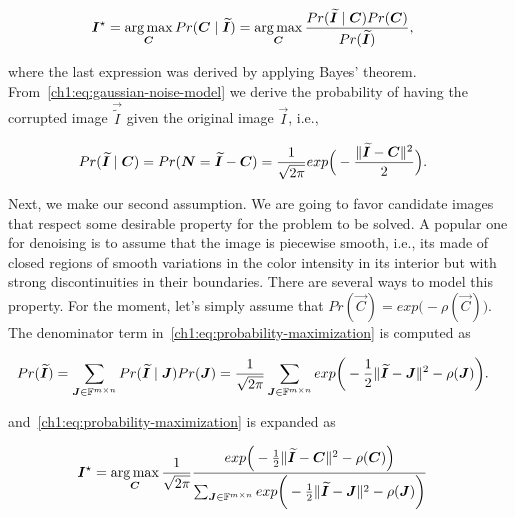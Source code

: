 \begin{align}
	\bm{I}^{\star} & = \operatorname*{arg\,max} _{\bm{C}}{Pr(\bm{C} \; | \;\bm{\widetilde{I}})} = \operatorname*{arg\,max} _{\bm{C}} \frac{Pr(\bm{\widetilde{I}} \; | \; \bm{C})Pr(\bm{C})}{Pr(\bm{\widetilde{I}})},
	\label{ch1:eq:probability-maximization}
\end{align}

where the last expression was derived by applying Bayes' theorem. From~\cref{ch1:eq:gaussian-noise-model} we derive the probability of having the corrupted image $\vec{\widetilde{I}}$ given the original image $\vec{I}$, i.e.,

\begin{align}
	Pr(\bm{\widetilde{I}} \; | \; \bm{C}) &= Pr( \bm{N} = \bm{\widetilde{I}} - \bm{C} ) = \frac{1}{\sqrt{2\pi}}exp\Big(- \frac{ \lVert\bm{\widetilde{I}} - \bm{C} \rVert^2}{2} \Big).
	\label{ch1:eq:probability-corrupted-image-given-original}
\end{align}

Next, we make our second assumption. We are going to favor candidate images that respect some desirable property for the problem to be solved. A popular one for denoising is to assume that the image is piecewise smooth, i.e., its made of closed regions of smooth variations in the color intensity in its interior but with strong discontinuities in their boundaries. There are several ways to model this property. For the moment, let's simply assume that $Pr(\vec{C}) = exp\big(-\rho(\vec{C})\big)$. The denominator term in~\cref{ch1:eq:probability-maximization} is computed as

\begin{align*}
	Pr(\widetilde{\bm{I}}) &= \sum_{\bm{J} \in \mathbb{F}^{m \times n}}{Pr(\bm{\widetilde{I}}\;|\; \bm{J})Pr(\bm{J})} = \frac{1}{\sqrt{2 \pi}}\sum_{\bm{J} \in \mathbb{F}^{m \times n}}{exp\bigg(-\frac{1}{2}\lVert\widetilde{\bm{I}}-\bm{J}\rVert^2 - \rho(\bm{J})}\bigg).
\end{align*}

and~\cref{ch1:eq:probability-maximization} is expanded as

\begin{align}
	\bm{I}^{\star} & = \operatorname*{arg\,max} _{\bm{C}} \frac{1}{\sqrt{2\pi}} \frac{exp\Big(- \frac{1}{2}\lVert\bm{\widetilde{I}} - \bm{C}\rVert^2 - \rho(\bm{C}) \Big) }{ \sum_{\bm{J} \in \mathbb{F}^{m \times n}}{exp\bigg(-\frac{1}{2}\lVert\widetilde{\bm{I}}-\bm{J}\rVert^2 - \rho(\bm{J})}\bigg) }
	\label{ch1:eq:probability-maximization-expanded}
\end{align}

